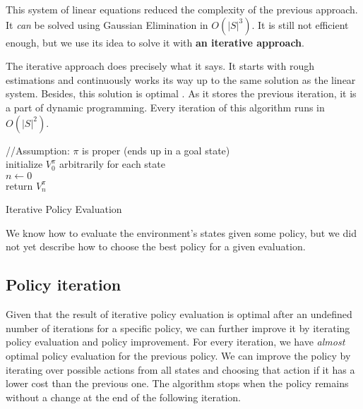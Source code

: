 This system of linear equations reduced the complexity of the previous approach. It \textit{can} be solved using Gaussian Elimination in $O(|S|^3)$. It is still not efficient enough, but we use its idea to solve it with \textbf{an iterative approach}.

The iterative approach does precisely what it says. 
It starts with rough estimations and continuously works its way up to the same solution as the linear system. Besides, this solution is optimal \cite{Kolobov2012}. As it stores the previous iteration, it is a part of dynamic programming. Every iteration of this algorithm runs in $O(|S|^2)$.

\LinesNumbered
\begin{algorithm}[H]
\SetAlgoLined
//Assumption: $\pi$ is proper (ends up in a goal state) \\
initialize $V^{\pi}_0$ arbitrarily for each state \\
$n \xleftarrow{} 0$ \\
return $V^{\pi}_n$
\caption{Iterative Policy Evaluation}
\end{algorithm}

We know how to evaluate the environment's states given some policy, but we did not yet describe how to choose the best policy for a given evaluation. 

\subsection{Policy iteration}
Given that the result of iterative policy evaluation is optimal after an undefined number of iterations for a specific policy, we can further improve it by iterating policy evaluation and policy improvement.
For every iteration, we have \textit{almost} optimal policy evaluation for the previous policy. We can improve the policy by iterating over possible actions from all states and choosing that action if it has a lower cost than the previous one. The algorithm stops when the policy remains without a change at the end of the following iteration.

